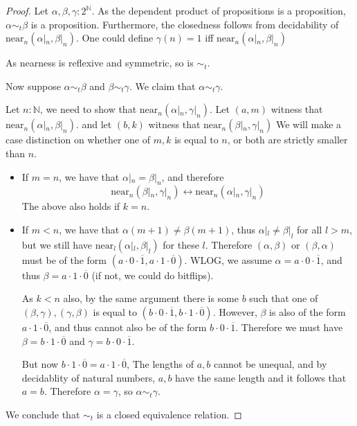 \begin{proof}
   Let $\alpha, \beta, \gamma : 2^\mathbb N$. 
   As the dependent product of propositions is a proposition, $\alpha \sim_t\beta$ is a proposition. 
   Furthermore, the closedness follows from decidability of $\text{near}_n(\alpha|_n, \beta|_n)$. 
   One could define $\gamma(n) = 1$ iff $\text{near}_n(\alpha|_n, \beta|_n)$
   
   As nearness is reflexive and symmetric, so is $\sim_t$. 

   Now suppose $\alpha \sim_t \beta$ and $\beta\sim_t \gamma$. 
   We claim that $\alpha \sim_t \gamma$. 

   Let $n:\mathbb N$, we need to show that 
   $\text{near}_n(\alpha|_n , \gamma|_n)$. 
   Let $(a,m)$ witness that $\text{near}_n(\alpha|_n, \beta|_n)$.
   and let $(b, k)$ witness that $\text{near}_n(\beta|_n, \gamma|_n)$
   We will make a case distinction on whether one of $m,k$ is equal to $n$, or
   both are strictly smaller than $n$. 
   \begin{itemize}
     \item 
       If $m=n$, we have that $\alpha|_n = \beta|_n$, and therefore 
       \begin{equation}
         \text{near}_n(\beta|_n, \gamma|_n) \leftrightarrow \text{near}_n(\alpha|_n, \gamma|_n)
       \end{equation} 
       The above also holds if $k = n$.
     \item 
       If $m< n$, we have that $\alpha(m+1) \neq \beta(m+1)$, thus 
       $\alpha|_l \neq \beta|_l$ for all $l>m$, 
       but we still have $\text{near}_l(\alpha|_l, \beta|_l)$ for these $l$. 
       Therefore $(\alpha, \beta)$ or $(\beta, \alpha)$ must be of the form
       $(a \cdot 0 \cdot \overline 1, a \cdot 1 \cdot \overline 0)$. 
       WLOG, we assume $\alpha = a \cdot 0 \cdot \overline 1$, and thus 
       $\beta = a \cdot 1 \cdot \overline 0$ (if not, we could do bitflips). 

       As $k<n$ also, by the same argument there is some $b$ such that one of 
       $(\beta,\gamma), (\gamma, \beta)$
       is equal to $(b\cdot 0 \cdot \overline 1, b \cdot 1 \cdot \overline 0)$. 
       However, $\beta$ is also of the form $a \cdot 1 \cdot \overline 0$, and 
       thus cannot also be of the form $b \cdot 0 \cdot \overline 1$. 
       Therefore we must have 
       $\beta = b\cdot 1 \cdot \overline 0$ and 
       $\gamma= b\cdot 0 \cdot \overline 1$. 

       But now $b \cdot 1 \cdot \overline 0 = a \cdot 1 \cdot \overline 0$, 
       The lengths of $a,b$ cannot be unequal, and by decidablity of natural numbers, 
       $a,b$ have the same length and it follows that $ a = b$. 
       Therefore $ \alpha = \gamma$, so $\alpha \sim_t\gamma$.
   \end{itemize}

   We conclude that $\sim_t$ is a closed equivalence relation. 
\end{proof}

